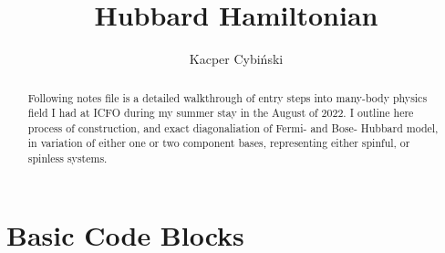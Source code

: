 \documentclass[12pt,a4paper]{article}
\title{Hubbard Hamiltonian}
\author{Kacper Cybiński}
\date{\displaydate{date}}
\begin{document}
    \maketitle

    \begin{abstract}
        Following notes file is a detailed walkthrough of entry steps into many-body physics field I had at ICFO during my summer stay in the August of 2022. I outline here process of construction, and exact diagonaliation of Fermi- and Bose- Hubbard model, in variation of either one or two component bases, representing either spinful, or spinless systems.
    \end{abstract}

    \section{Basic Code Blocks}
    
\end{document}
